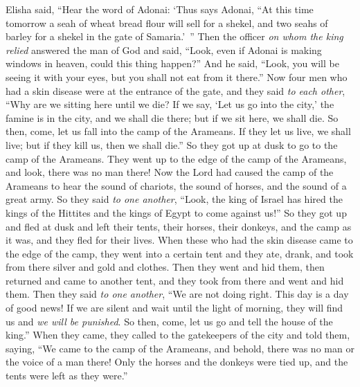 \begin{biblechapter} %
 Elisha said, “Hear the word of Adonai: ‘Thus says Adonai, “At this time tomorrow a seah of wheat bread flour will sell for a shekel, and two seahs of barley for a shekel in the gate of Samaria.’ ”
\verse Then the officer \textit{on whom the king relied} answered the man of God and said, “Look, even if Adonai is making windows in heaven, could this thing happen?” And he said, “Look, you will be seeing it with your eyes, but you shall not eat from it there.”
 Now four men who had a skin disease were at the entrance of the gate, and they said \textit{to each other}, “Why are we sitting here until we die?
\verse If we say, ‘Let us go into the city,’ the famine is in the city, and we shall die there; but if we sit here, we shall die. So then, come, let us fall into the camp of the Arameans. If they let us live, we shall live; but if they kill us, then we shall die.”
\verse So they got up at dusk to go to the camp of the Arameans. They went up to the edge of the camp of the Arameans, and look, there was no man there!
\verse Now the Lord had caused the camp of the Arameans to hear the sound of chariots, the sound of horses, and the sound of a great army. So they said \textit{to one another}, “Look, the king of Israel has hired the kings of the Hittites and the kings of Egypt to come against us!”
\verse So they got up and fled at dusk and left their tents, their horses, their donkeys, and the camp as it was, and they fled for their lives.
\verse When these who had the skin disease came to the edge of the camp, they went into a certain tent and they ate, drank, and took from there silver and gold and clothes. Then they went and hid them, then returned and came to another tent, and they took from there and went and hid them.
\verse Then they said \textit{to one another}, “We are not doing right. This day is a day of good news! If we are silent and wait until the light of morning, they will find us and \textit{we will be punished}. So then, come, let us go and tell the house of the king.”
\verse When they came, they called to the gatekeepers of the city and told them, saying, “We came to the camp of the Arameans, and behold, there was no man or the voice of a man there! Only the horses and the donkeys were tied up, and the tents were left as they were.”

\end{biblechapter}
